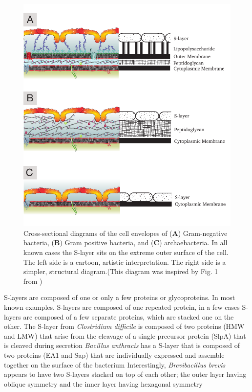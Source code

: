 \begin{figure}[htb] %
  \begin{center}
    \includegraphics{intro/img/celwalls.pdf}
  \end{center}
  \caption[Cross-sectional diagrams of \ac{S-layer} containing cell envelopes]{Cross-sectional
    diagrams of the cell envelopes of (\textbf{A}) Gram-negative bacteria, (\textbf{B}) Gram
    positive bacteria, and (\textbf{C}) archaebacteria. In all known cases the \ac{S-layer} sits on
    the extreme outer surface of the cell. The left side is a cartoon, artistic interpretation. The right side is a simpler, structural diagram.(This diagram was inspired by Fig. 1 from
    )}
  \label{fig:cellwalls}
\end{figure}

\Acp{S-layer} are composed of one or only a few proteins or glycoproteins. In most known examples,
\acp{S-layer} are composed of one repeated protein, in a few cases \acp{S-layer} are composed
of a few separate proteins, which are stacked one on the other. The \ac{S-layer} from \textit{Clostridium difficile} is composed of two
proteins (HMW and LMW) that arise from the cleavage of a single precursor protein (SlpA) that is
cleaved during secretion \textit{Bacillus
  anthracis} has a \ac{S-layer} that is composed of two proteins (EA1 and Sap) that are individually
expressed and assemble together on the surface of the bacterium
Interestingly, \textit{Brevibacillus brevis} appears to have two \acp{S-layer} stacked on top of each
other; the outer layer having oblique symmetry and the inner layer having hexagonal
symmetry
    

